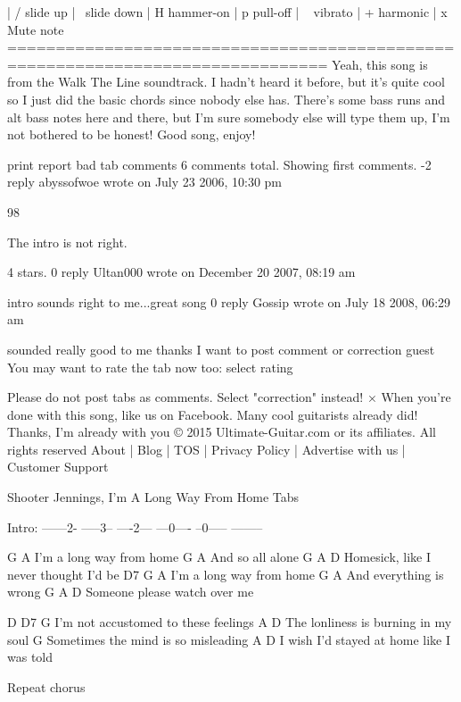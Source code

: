 | /  slide up
| \  slide down
| H  hammer-on
| p  pull-off
| ~  vibrato
| +  harmonic
| x  Mute note
===============================================================================
Yeah, this song is from the Walk The Line soundtrack. I hadn't heard it before,
but it's quite cool so I just did the basic chords since nobody else has. There's
some bass runs and alt bass notes here and there, but I'm sure somebody else will
type them up, I'm not bothered to be honest! Good song, enjoy!

print
report bad tab
comments
6 comments total. Showing first comments.
-2
reply
abyssofwoe wrote on July 23 2006, 10:30 pm

98%

The intro is not right.

4 stars.
0
reply
Ultan000 wrote on December 20 2007, 08:19 am

intro sounds right to me...great song
0
reply
Gossip wrote on July 18 2008, 06:29 am

sounded really good to me
thanks
I want to post comment or correction
guest
You may want to rate the tab now too:
select rating
	
Please do not post tabs as comments. Select "correction" instead!
×
When you're done with this song, like us on Facebook. Many cool guitarists already did!
Thanks, I'm already with you
© 2015 Ultimate-Guitar.com or its affiliates. All rights reserved     About | Blog | TOS | Privacy Policy | Advertise with us | Customer Support



















Shooter Jennings, I'm A Long Way From Home Tabs

Intro:
------2-
-----3--
----2---
---0----
--0-----
--------

      G    A
I'm a long way from home
G      A
And so all alone
G                A                 D
Homesick, like I never thought I'd be
D7    G    A
I'm a long way from home
G        A
And everything is wrong
G              A          D
Someone please watch over me


D         D7                G
I'm not accustomed to these feelings
    A                       D                
The lonliness is burning in my soul
                            G
Sometimes the mind is so misleading
A                                    D
I wish I'd stayed at home like I was told


Repeat chorus

